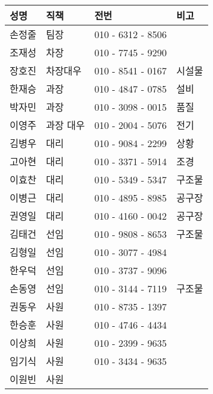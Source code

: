 \documentclass[aspectratio=1610,20pt,xcolor=pdftex,dvipsnames,table,handout]{beamer}
\begin{document}
\begin{frame} [t,plain]
\begin{center}
{\begin{tabularx}{\textwidth}{ p{} p{} p{} p{}   }
				성명   	& 직책		& 전번  		&비고			\\ \hline				\hline				
				손정줄	&	팀장	&	010 - 6312 - 8506 	&		  \\ \hline				
				조재성	&	차장	&	010 - 7745 - 9290	&		 \\ \hline				
				장호진	&	차장대우	&	010 - 8541 - 0167	&	시설물	 \\ \hline				\hline				
				한재승	&	과장	&	010 - 4847 - 0785	&	설비	 \\ \hline				
				박자민	&	과장	&	010 - 3098 - 0015	&	품질	 \\ \hline				
				이영주	&	과장 대우	&	010 - 2004 - 5076	&	전기	 \\ \hline				\hline				
				김병우	&	대리	&	010 - 9084 - 2299	&	상황	 \\ \hline				
				고아현	&	대리	&	010 - 3371 - 5914	&	조경	 \\ \hline				
				이효찬	&	대리	&	010 - 5349 - 5347	&	구조물	 \\ \hline				\hline				
				이병근	&	대리	&	010 - 4895 - 8985	&	공구장	 \\ \hline				
				권영일	&	대리	&	010 - 4160 - 0042	&	공구장	 \\ \hline				\hline				
				김태건	&	선임	&	010 - 9808 - 8653	&	구조물	 \\ \hline				
				김형일	&	선임	&	010 - 3077 - 4984	&		 \\ \hline				
				한우덕	&	선임	&	010 - 3737 - 9096	&		 \\ \hline				
				손동영	&	선임	&	010 - 3144 - 7119	&	구조물	 \\ \hline				\hline				
				권동우	&	사원	&	010 - 8735 - 1397	&		 \\ \hline				
				한승훈	&	사원	&	010 - 4746 - 4434	&		 \\ \hline				
				이상희	&	사원	&	010 - 2399 - 9635	&		 \\ \hline				
				임기식	&	사원	&	010 - 3434 - 9635	&		 \\ \hline				
				이원빈	&	사원	&		&		 \\ \hline				\hline				

			\end{tabularx}
			}
			\end{center}%



		\end{frame}						
\end{document}
